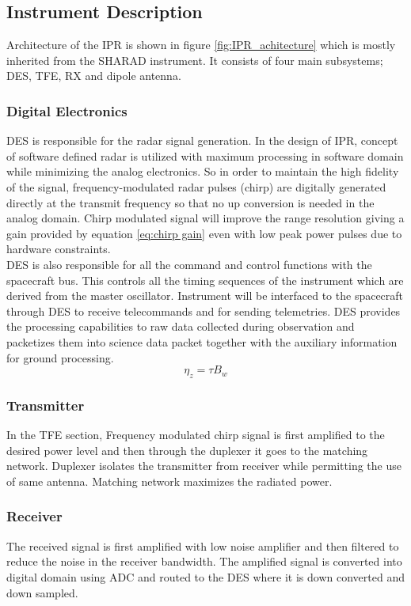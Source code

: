 \subsection{Instrument Description}
Architecture of the \ac{IPR} is shown in figure \ref{fig:IPR_achitecture} which is mostly inherited from the SHARAD instrument. It  consists of four main subsystems; \ac{DES}, \ac{TFE}, \ac{RX} and dipole antenna.
\subsubsection{Digital Electronics}
\ac{DES} is responsible for the radar signal generation. In the design of \ac{IPR}, concept of software defined radar is utilized with maximum processing in software domain while minimizing the analog electronics. So in order to maintain the high fidelity of the signal, frequency-modulated radar pulses (chirp) are digitally generated directly at the transmit frequency so that no up conversion is needed in the analog domain. Chirp modulated signal will improve the range resolution giving a gain provided by equation \ref{eq:chirp gain} even with low peak power pulses due to hardware constraints.\\
\ac{DES} is also responsible for all the command and control functions with the spacecraft bus. This controls all the timing sequences of the instrument which are derived from the master oscillator. Instrument will be interfaced to the spacecraft through \ac{DES} to receive telecommands and for sending telemetries. \ac{DES} provides the processing capabilities to raw data collected during observation and packetizes them into science data packet together with the auxiliary information for ground processing.
\begin{equation}
\eta_{z} = \tau B_{w}
\label{eq:chirp gain}
\end{equation}
%
\subsubsection{Transmitter}
In the \ac{TFE} section, Frequency modulated chirp signal is first amplified to the desired power level and then through the duplexer it goes to the matching network. Duplexer isolates the transmitter from receiver while permitting the use of same antenna. Matching network maximizes the radiated power.
%
\subsubsection{Receiver}
The received signal is first amplified with low noise amplifier and then filtered to reduce the noise in the receiver bandwidth. The amplified signal is converted into digital domain using \ac{ADC} and routed to the \ac{DES} where it is down converted and down sampled.
